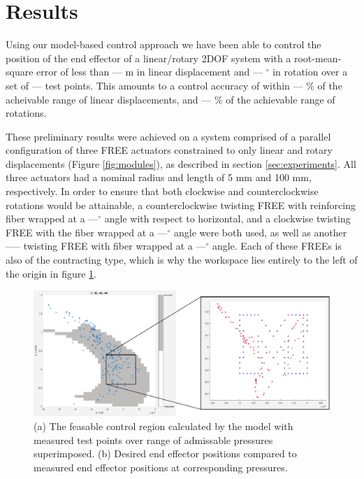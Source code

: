 \section{Results}   \label{sec:results}



Using our model-based control approach we have been able to control the position of the end effector of a linear/rotary 2DOF system with a root-mean-square error of less than --- m in linear displacement and --- $^\circ$ in rotation over a set of --- test points. This amounts to a control accuracy of within --- \% of the acheivable range of linear displacements, and --- \% of the achievable range of rotations.

These preliminary results were achieved on a system comprised of a parallel configuration of three FREE actuators constrained to only linear and rotary displacements (Figure \ref{fig:modules}), as described in section \ref{sec:experiments}. All three actuators had a nominal radius and length of 5 mm and 100 mm, respectively. In order to ensure that both clockwise and counterclockwise rotations would be attainable, a counterclockwise twisting FREE with reinforcing fiber wrapped at a ---$^\circ$ angle with respect to horizontal, and a clockwise twisting FREE with the fiber wrapped at a ---$^\circ$ angle were both used, as well as another ----- twisting FREE with fiber wrapped at a ---$^\circ$ angle. Each of these FREEs is also of the contracting type, which is why the workspace lies entirely to the left of the origin in figure \ref{fig:results}.


\begin{figure}
    \centering
    \includegraphics[width=\linewidth]{figures/resultsDiagram.pdf}
    \caption{(a) The feasable control region calculated by the model with measured test points over range of admissable pressures superimposed. (b) Desired end effector positions compared to measured end effector positions at corresponding pressures. }
    \label{fig:results}
\end{figure}

